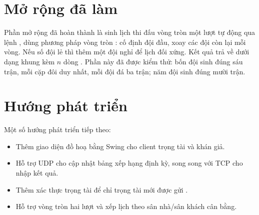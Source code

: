 \section{Mở rộng đã làm}

Phần mở rộng đã hoàn thành là sinh lịch thi đấu vòng tròn một lượt tự động qua
lệnh , dùng phương pháp vòng tròn :
cố định đội đầu, xoay các đội còn lại mỗi vòng. Nếu số đội lẻ thì thêm một đội
nghỉ  để lịch đối xứng. Kết quả trả về dưới dạng khung
 kèm \(n\) dòng . Phần này
đã được kiểm thử: bốn đội sinh đúng sáu trận, mỗi cặp đôi duy nhất, mỗi đội đá
ba trận; năm đội sinh đúng mười trận.

\section{Hướng phát triển}

Một số hướng phát triển tiếp theo:
\begin{itemize}[leftmargin=1.6em, itemsep=2pt]
  \item Thêm giao diện đồ hoạ bằng Swing cho client trọng tài và khán giả.
  \item Hỗ trợ UDP cho cập nhật bảng xếp hạng định kỳ, song song với TCP cho
        nhập kết quả.
  \item Thêm xác thực trọng tài để chỉ trọng tài mới được gửi .
  \item Hỗ trợ vòng tròn hai lượt  và xếp lịch theo sân
        nhà/sân khách cân bằng.
\end{itemize}
